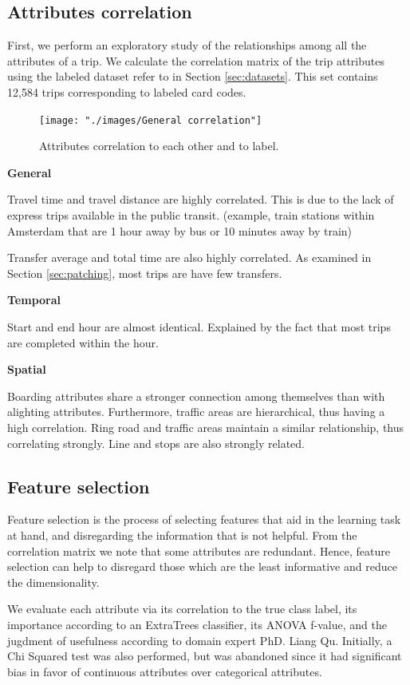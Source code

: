 \documentclass{article}
\begin{document}
\subsection{Attributes correlation} %
First, we perform an exploratory study of the relationships among all the attributes of a trip. We calculate the correlation matrix of the trip attributes using the labeled dataset refer to in Section \ref{sec:datasets}. This set contains 12,584 trips corresponding to labeled card codes.

\begin{figure}[H]
  \centering
  \texttt{[image: "./images/General correlation"]}
  \caption{Attributes correlation to each other and to label.}
  \label{fig:classification/correlation}
\end{figure}

\textbf{General} %

Travel time and travel distance are highly correlated. This is due to the lack of express trips available in the public transit. (example, train stations within Amsterdam that are 1 hour away by bus or 10 minutes away by train)

Transfer average and total time are also highly correlated. As examined in Section \ref{sec:patching}, most trips are have few transfers. 

\textbf{Temporal}

Start and end hour are almost identical. Explained by the fact that most trips are completed within the hour. 

\textbf{Spatial}

Boarding attributes share a stronger connection among themselves than with alighting attributes. Furthermore, traffic areas are hierarchical, thus having a high correlation. Ring road and traffic areas maintain a similar relationship, thus correlating strongly. Line and stops are also strongly related. 

\subsection{Feature selection}
Feature selection is the process of selecting features that aid in the learning task at hand, and disregarding the information that is not helpful. From the correlation matrix we note that some attributes are redundant. Hence, feature selection can help to disregard those which are the least informative and reduce the dimensionality.

We evaluate each attribute via its correlation to the true class label, its importance according to an ExtraTrees classifier, its ANOVA f-value, and the jugdment of usefulness according to domain expert PhD. Liang Qu. Initially, a Chi Squared test was also performed, but was abandoned since it had significant bias in favor of continuous attributes over categorical attributes. 
\end{document}
